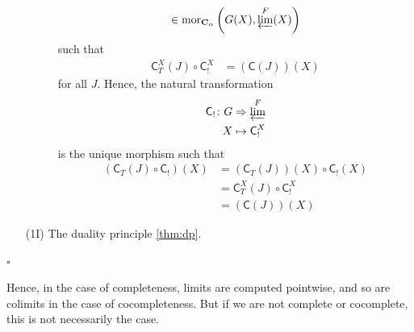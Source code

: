 \begin{prf}
\begin{enumerate}
\begin{description}
\begin{align*}
  \in
  \mathrm{mor}_{\mathbf{C}_{\alpha}}
  \left(
    G(X),
    \varprojlim^{F}(X)
  \right)
\end{align*}
such that
\begin{align*}
  \mathsf{C}_{T}^{X}(J)
  \circ
  \mathsf{C}_{!}^{X}
  &=
  (\mathsf{C}(J))(X)
\end{align*}
for all $J$.
Hence, the natural transformation
\begin{align*}
  \mathsf{C}_{!}
  \colon
  G
  &\Rightarrow
  \varprojlim^{F}
  \\
  X
  &\mapsto
  \mathsf{C}_{!}^{X}
\end{align*}
is the unique morphism such that
\begin{align*}
  \left(
    \mathsf{C}_{T}(J)
    \circ
    \mathsf{C}_{!}
  \right)
  (X)
  &=
  \left(
    \mathsf{C}_{T}(J)
  \right)
  (X)
  \circ
  \mathsf{C}_{!}(X)
  \\
  &=
  \mathsf{C}_{T}^{X}(J)
  \circ
  \mathsf{C}_{!}^{X}
  \\
  &=
  (\mathsf{C}(J))(X)
\end{align*}
\end{description}
\item[(1I)]
The duality principle \ref{thm:dp}.
\end{enumerate}
\phantom{proven}
\hfill
$\square$
\end{prf}
Hence, in the case of completeness, limits are computed {\glqq}pointwise{\grqq}, and so are colimits in the case of cocompleteness.
But if we are not complete or cocomplete, this is not necessarily the case.
